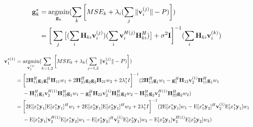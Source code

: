 \documentclass[11pt, oneside]{article}   	%
\begin{document}
\begin{align*}
\textbf{g}^*_{k} 	&= \operatornamewithlimits{argmin}_{\textbf{g}_{k}}	(\displaystyle\sum_{k} 	\bigg[	MSE_{k}	+	\lambda_{i}	(\displaystyle\sum_{j}	\|	\textbf{v}^{(j)}_{i}	\|	-P	)	\bigg])	\\
			&= \bigg[	\displaystyle\sum_{j}
				\big[	(\displaystyle\sum_{i}\textbf{H}_{ki}\textbf{v}^{(j)}_{i})
			      (\displaystyle\sum_{i}\textbf{v}^{H(j)}_{i}\textbf{H}^{H}_{ki})	\big]	 +\sigma^2	\textbf{I}
			      \bigg]^{-1}	(\displaystyle\sum_{i}	\textbf{H}_{ki}	\textbf{v}^{(k)}_{i})		      
\end{align*}

\begin{align*}
\textbf{v}^{*(1)}_{1}  &= \operatornamewithlimits{argmin}_{\textbf{v}^{(1)}_{1}}	(\displaystyle\sum_{k=1,2} 	\bigg[	MSE_{k}	+	\lambda_{k}	(\displaystyle\sum_{j=1,2}	\|	\textbf{v}^{(j)}_{k}	\|	-P	)	\bigg])	\\
			       &=\bigg[ 2	\textbf{H}^{H}_{11}	\textbf{g}_{1}	\textbf{g}^{H}_{1}		\textbf{H}_{11}	w_1
				   +	2	\textbf{H}^{H}_{21}	\textbf{g}_{2}	\textbf{g}_{2}		\textbf{H}_{21}	w_2	+2	\lambda^{*}_1 I
				   \bigg]^{-1} 
				   (
				   2	\textbf{H}^{H}_{11}	\textbf{g}_{1}	w_1	
				   -\textbf{g}^{H}_{1}	\textbf{H}_{12}	\textbf{v}^{(1)}_{2} 	\textbf{H}^{H}_{11}	\textbf{g}_{1}	w_1	\\
				   &\ \ \ \ 
				   -	\textbf{H}^{H}_{11}	\textbf{g}_{1}	\textbf{v}^{H(1)}_{2}	\textbf{H}^{H}_{12}	\textbf{g}_{1}	w_1
				   -	\textbf{g}^{H}_{2}	\textbf{H}_{22}	\textbf{v}^{(1)}_{2} 	\textbf{H}^{H}_{21}	\textbf{g}_{2}	w_2
				   -	\textbf{H}^{H}_{21}	\textbf{g}_{2}	\textbf{v}^{H(1)}_{2}	\textbf{H}^{H}_{22}	\textbf{g}_{2}	w_2
				   )\\
			      &=\bigg[	2	\mathrm{E}[x^*_1	\textbf{y}_1]	\mathrm{E}[x^*_1	\textbf{y}_1]^H	w_1
			      			+	2	\mathrm{E}[x^*_2	\textbf{y}_1]	\mathrm{E}[x^*_2	\textbf{y}_1]^H	w_2	+2	\lambda^{*}_1 I
			      	  \bigg]^{-1} 
				  (2	\mathrm{E}[x^*_1	\textbf{y}_1]	w_1
				  -\mathrm{E}[x^*_1	\textbf{y}_2]^H	\textbf{v}^{(1)}_{2} 	\mathrm{E}[x^*_1	\textbf{y}_1]	w_1	\\
				  &\ \ \ \ 	
				  -\mathrm{E}[x^*_1	\textbf{y}_1]	\textbf{v}^{H(1)}_{2} 	\mathrm{E}[x^*_1	\textbf{y}_2]	w_1	
				  -\mathrm{E}[x^*_2	\textbf{y}_2]^H	\textbf{v}^{(1)}_{2} 	\mathrm{E}[x^*_2	\textbf{y}_1]	w_2
				   -\mathrm{E}[x^*_2	\textbf{y}_1]	\textbf{v}^{H(1)}_{2} 	\mathrm{E}[x^*_2	\textbf{y}_2]	w_2	
				   )
\end{align*}
\end{document}
